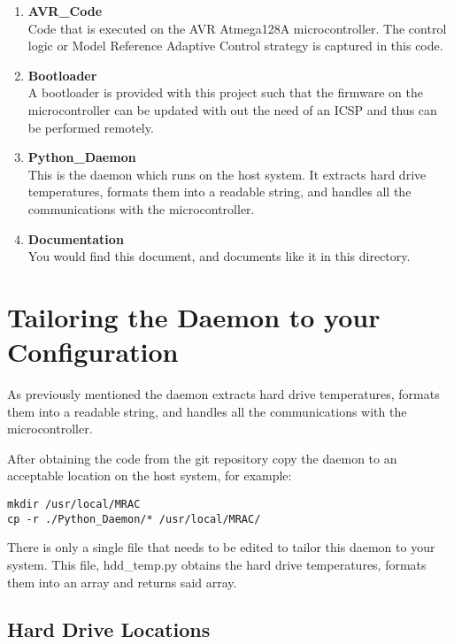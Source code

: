 \documentclass[10pt,letterpaper]{report}
\begin{document}
\begin{enumerate}
\item \textbf{AVR\_Code} \\

Code that is executed on the AVR Atmega128A microcontroller. The control logic or Model Reference Adaptive Control strategy is captured in this code.

\item \textbf{Bootloader}\\

A bootloader is provided with this project such that the firmware on the microcontroller can be updated with out the need of an ICSP and thus can be performed remotely.

\item \textbf{Python\_Daemon}\\

This is the daemon which runs on the host system. It extracts hard drive temperatures, formats them into a readable string, and handles all the communications with the microcontroller.

\item \textbf{Documentation}\\

You would find this document, and documents like it in this directory.

\end{enumerate}

\section{Tailoring the Daemon to your Configuration}

As previously mentioned the daemon extracts hard drive temperatures, formats them into a readable string, and handles all the communications with the microcontroller. 

After obtaining the code from the git repository copy the daemon to an acceptable location on the host system, for example:
%
\begin{verbatim}
mkdir /usr/local/MRAC
cp -r ./Python_Daemon/* /usr/local/MRAC/
\end{verbatim}
%
There is only a single file that needs to be edited to tailor this daemon to your system. This file, hdd\_temp.py obtains the hard drive temperatures, formats them into an array and returns said array.

\subsection{Hard Drive Locations}
\end{document}
